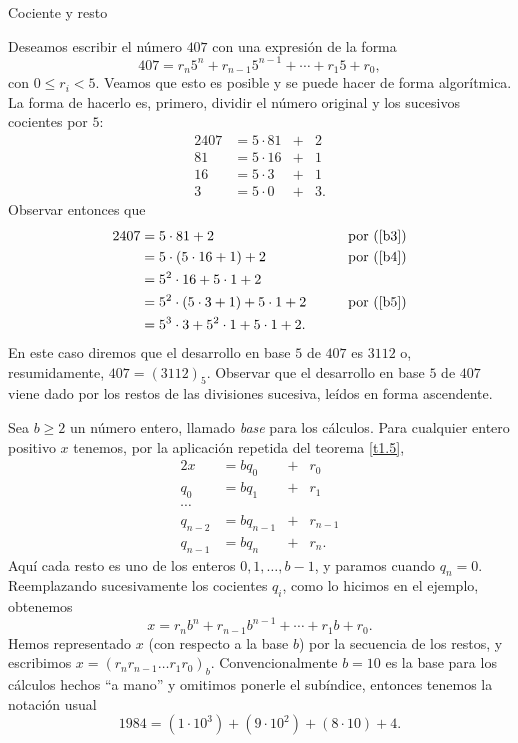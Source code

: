 \begin{section}{Cociente y resto}
\begin{ejemplo} Deseamos escribir el número $407$ con una expresión de la forma 
$$
407 = r_n5^n +r_{n-1} 5^{n-1}+\cdots + r_1 5 + r_0,
$$
con $0 \le r_i < 5$. Veamos que esto es posible y se puede hacer de forma algorítmica. La forma de hacerlo  es, primero, dividir el número original y los sucesivos cocientes por $5$:  
\begin{alignat}2
407 &=5\cdot 81 &+& 2 \label{b3}\\
81 & = 5\cdot 16 &+& 1  \label{b4}\\
16 & = 5\cdot 3 &+& 1  \label{b5}\\
3 & = 5\cdot 0 &+& 3.
\end{alignat}
Observar entonces que
\begin{alignat*}2
407 &=5\cdot 81 + 2  &\qquad& \text{por (\ref{b3})}\\
 &= 5\cdot (5\cdot 16 + 1) + 2  &\qquad& \text{por (\ref{b4})}\\
 &= 5^2 \cdot 16+ 5\cdot 1 + 2 &\qquad& \text{}\\
 &= 5^2 \cdot (5\cdot 3 + 1)+ 5\cdot 1 + 2   &\qquad& \text{por (\ref{b5})}\\
 &= 5^3 \cdot 3+ 5^2 \cdot 1 + 5\cdot 1 + 2.  &\qquad& \text{}
\end{alignat*}
En este caso diremos que el desarrollo en base $5$ de $407$ es $3112$ o, resumidamente, $407 = (3112)_5$.  Observar que el desarrollo en base $5$ de $407$ viene dado por los restos de las divisiones sucesiva, leídos en forma ascendente.
\end{ejemplo}


Sea
$b \ge 2$ un número entero, llamado {\em base} para los cálculos.
Para cualquier entero positivo $x$ tenemos, por la aplicación
repetida del teorema \ref{t1.5},
\begin{alignat*}2
x&=bq_0 &+& r_0 \\
q_0 & = bq_1 &+&r_1 \\
\cdots & \\
q_{n-2} & = bq_{n-1} &+&r_{n-1} \\
q_{n-1} & = bq_n &+&r_n.
\end{alignat*}
Aquí cada resto es uno de los enteros $0, 1,\ldots,b-1$, y paramos
cuando $q_n=0$. Reemplazando sucesivamente los cocientes $q_i$, como lo hicimos en el ejemplo, obtenemos
$$
x=r_nb^n +r_{n-1} b^{n-1}+\cdots + r_1 b + r_0.
$$
Hemos representado $x$ (con respecto a la base $b$) por la
secuencia de los restos, y escribimos $x=(r_nr_{n-1}\dots r_1
r_0)_b$. Convencionalmente $b=10$ es la base para los cálculos
hechos ``a mano'' y omitimos ponerle el subíndice, entonces
tenemos la notación usual
$$
1984=(1\cdot 10^3 ) + (9\cdot 10^2 )+(8\cdot 10 ) + 4.
$$




\end{section}

